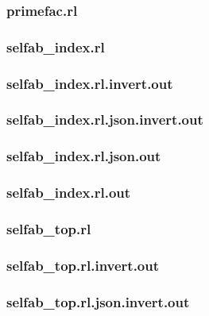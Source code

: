 \subsubsection{primefac.rl}
\label{app:primefac_rl}

\subsubsection{selfab\_index.rl}
\label{app:selfab_index_rl}

\subsubsection{selfab\_index.rl.invert.out}
\label{app:selfab_index_rl.invert.out}

\subsubsection{selfab\_index.rl.json.invert.out}
\label{app:selfab_index_rl.json.invert.out}

\subsubsection{selfab\_index.rl.json.out}
\label{app:selfab_index_rl.json.out}

\subsubsection{selfab\_index.rl.out}
\label{app:selfab_index_rl.out}

\subsubsection{selfab\_top.rl}
\label{app:selfab_top_rl}

\subsubsection{selfab\_top.rl.invert.out}
\label{app:selfab_top_rl.invert.out}

\subsubsection{selfab\_top.rl.json.invert.out}
\label{app:selfab_top_rl.json.invert.out}

